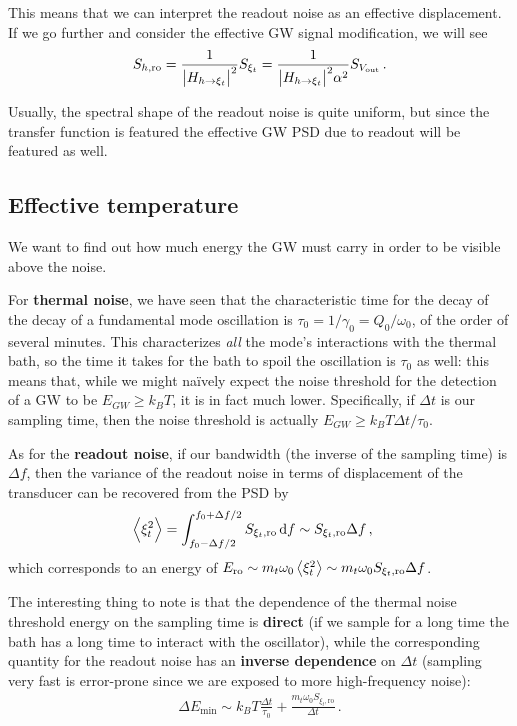 \documentclass[main.tex]{subfiles}
\begin{document}
This means that we can interpret the readout noise as an effective displacement. If we go further and consider the effective GW signal modification, we will see 
%
\begin{align}
S_{h, \text{ro}} = \frac{1}{\abs{H_{h \to \xi_{t}}}^2}
S_{\xi_{t}} = \frac{1}{\abs{H_{h \to \xi_{t}}}^2 \alpha^2} S_{V _{\text{out}}}
\,.
\end{align}

Usually, the spectral shape of the readout noise is quite uniform, but since the transfer function is featured the effective GW PSD due to readout will be featured as well. 

\subsection{Effective temperature}

We want to find out how much energy the GW must carry in order to be visible above the noise. 

For \textbf{thermal noise}, we have seen that the characteristic time for the decay of the decay of a fundamental mode oscillation is \(\tau_0 = 1/ \gamma_0 = Q_0 / \omega_0 \), of the order of several minutes. 
This characterizes \emph{all} the mode's interactions with the thermal bath, so the time it takes for the bath to spoil the oscillation is \(\tau_0 \) as well: this means that, while we might naïvely expect the noise threshold for the detection of a GW to be \(E_{GW} \geq k_B T\), it is in fact much lower. 
Specifically, if \(\Delta t\) is our sampling time, then the noise threshold is actually \(E_{GW} \geq k_B T \Delta t / \tau_0 \). 

As for the \textbf{readout noise}, if our bandwidth (the inverse of the sampling time) is \(\Delta f\), then the variance of the readout noise in terms of displacement of the transducer can be recovered from the PSD by
%
\begin{align}
\expval{\xi_{t}^2} &= \int_{f_0 - \Delta f / 2}^{f_0 + \Delta f / 2}
S_{\xi_{t} , \text{ro}} \dd{f} \sim S_{\xi_{t} , \text{ro}} \Delta f
\,,
\end{align}
%
which corresponds to an energy of \(E_{\text{ro}} \sim m_t \omega_0 \expval{\xi_{t}^2} \sim m_t \omega_0  S_{\xi_{t} , \text{ro}} \Delta f\).

The interesting thing to note is that the dependence of the thermal noise threshold energy on the sampling time is \textbf{direct} (if we sample for a long time the bath has a long time to interact with the oscillator), while the corresponding quantity for the readout noise has an \textbf{inverse dependence} on \(\Delta t\) (sampling very fast is error-prone since we are exposed to more high-frequency noise): 
%
\begin{align}
\Delta E _{\text{min}} \sim k_B T \frac{\Delta t}{\tau_0 }
+ \frac{m_t \omega_0 S_{\xi_{t}, \text{ro}}}{\Delta t}
\,.
\end{align}
\end{document}

